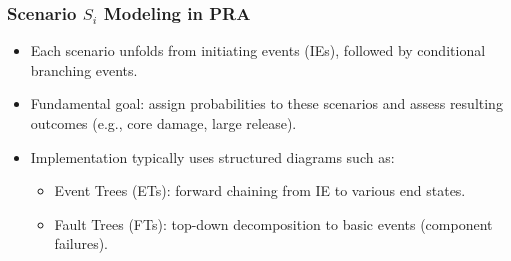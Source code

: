 \begin{frame}[allowframebreaks]
\frametitle{Scenario \(S_i\) Modeling in PRA}
\begin{itemize}
  \item Each scenario unfolds from initiating events (IEs), followed by conditional branching events.
          \vspace{6pt}
  \item Fundamental goal: assign probabilities to these scenarios {and} assess resulting outcomes (e.g., core damage, large release).
          \vspace{6pt}
  \item Implementation typically uses structured diagrams such as:
    \begin{itemize}
      \item Event Trees (ETs): forward chaining from IE to various end states.
      \item Fault Trees (FTs): top-down decomposition to basic events (component failures).
    \end{itemize}
\end{itemize}
\end{frame}

